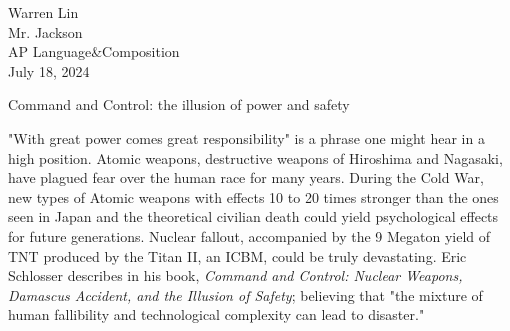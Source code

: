 \documentclass[12pt,letterpaper]{article}
\renewcommand{\maketitle}{\makemlaheader}
\newcommand{\makemlaheader}{
Warren Lin \\
Mr. Jackson\\
AP Language&Composition\\
July 18, 2024\\
\begin{center}\textnormal{Command and Control: the illusion of power and safety}\end{center}

}
\begin{document}
\begin{flushleft}


\maketitle

"With great power comes great responsibility" is a phrase one might hear in a high position. Atomic weapons, destructive weapons of Hiroshima and Nagasaki, have plagued fear over the human race for many years. During the Cold War, new types of Atomic weapons with effects 10 to 20 times stronger than the ones seen in Japan and the theoretical civilian death could yield psychological effects for future generations. Nuclear fallout, accompanied by the 9 Megaton yield of TNT produced by the Titan II, an ICBM, could be truly devastating. Eric Schlosser describes in his book, \textit{Command and Control: Nuclear Weapons, Damascus Accident, and the Illusion of Safety}; believing that "the mixture of human fallibility and technological complexity can lead to disaster."

\end{flushleft}
\end{document}
